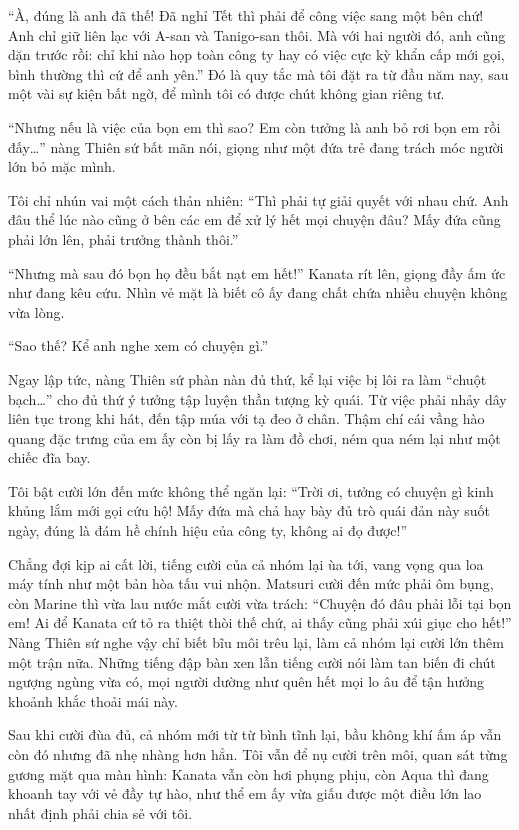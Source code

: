 \documentclass[../main.tex]{subfiles}
\begin{document}
``À, đúng là anh đã thế! Đã nghỉ Tết thì phải để công việc sang một bên chứ! Anh chỉ giữ liên lạc với A-san và Tanigo-san thôi. Mà với hai người đó, anh cũng dặn trước rồi: chỉ khi nào họp toàn công ty hay có việc cực kỳ khẩn cấp mới gọi, bình thường thì cứ để anh yên.'' Đó là quy tắc mà tôi đặt ra từ đầu năm nay, sau một vài sự kiện bất ngờ, để mình tôi có được chút không gian riêng tư.

``Nhưng nếu là việc của bọn em thì sao? Em còn tưởng là anh bỏ rơi bọn em rồi đấy\dots'' nàng Thiên sứ bất mãn nói, giọng như một đứa trẻ đang trách móc người lớn bỏ mặc mình.

Tôi chỉ nhún vai một cách thản nhiên: ``Thì phải tự giải quyết với nhau chứ. Anh đâu thể lúc nào cũng ở bên các em để xử lý hết mọi chuyện đâu? Mấy đứa cũng phải lớn lên, phải trưởng thành thôi.''

``Nhưng mà sau đó bọn họ đều bắt nạt em hết!'' Kanata rít lên, giọng đầy ấm ức như đang kêu cứu. Nhìn vẻ mặt là biết cô ấy đang chất chứa nhiều chuyện không vừa lòng.

``Sao thế? Kể anh nghe xem có chuyện gì.''

Ngay lập tức, nàng Thiên sứ phàn nàn đủ thứ, kể lại việc bị lôi ra làm ``chuột bạch\dots'' cho đủ thứ ý tưởng tập luyện thần tượng kỳ quái. Từ việc phải nhảy dây liên tục trong khi hát, đến tập múa với tạ đeo ở chân. Thậm chí cái vầng hào quang đặc trưng của em ấy còn bị lấy ra làm đồ chơi, ném qua ném lại như một chiếc đĩa bay.

Tôi bật cười lớn đến mức không thể ngăn lại: ``Trời ơi, tưởng có chuyện gì kinh khủng lắm mới gọi cứu hộ! Mấy đứa mà chả hay bày đủ trò quái đản này suốt ngày, đúng là đám hề chính hiệu của công ty, không ai đọ được!''

Chẳng đợi kịp ai cất lời, tiếng cười của cả nhóm lại ùa tới, vang vọng qua loa máy tính như một bản hòa tấu vui nhộn. Matsuri cười đến mức phải ôm bụng, còn Marine thì vừa lau nước mắt cười vừa trách: ``Chuyện đó đâu phải lỗi tại bọn em! Ai để Kanata cứ tỏ ra thiệt thòi thế chứ, ai thấy cũng phải xúi giục cho hết!'' Nàng Thiên sứ nghe vậy chỉ biết bĩu môi trêu lại, làm cả nhóm lại cười lớn thêm một trận nữa. Những tiếng đập bàn xen lẫn tiếng cười nói làm tan biến đi chút ngượng ngùng vừa có, mọi người dường như quên hết mọi lo âu để tận hưởng khoảnh khắc thoải mái này.

Sau khi cười đùa đủ, cả nhóm mới từ từ bình tĩnh lại, bầu không khí ấm áp vẫn còn đó nhưng đã nhẹ nhàng hơn hẳn. Tôi vẫn để nụ cười trên môi, quan sát từng gương mặt qua màn hình: Kanata vẫn còn hơi phụng phịu, còn Aqua thì đang khoanh tay với vẻ đầy tự hào, như thể em ấy vừa giấu được một điều lớn lao nhất định phải chia sẻ với tôi.
\end{document}
